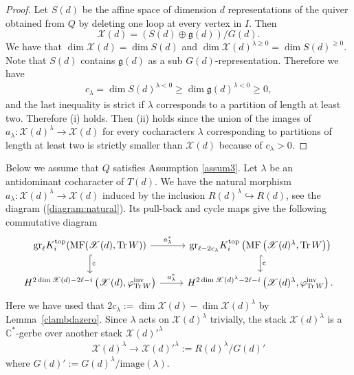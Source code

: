 \documentclass [11pt,oneside,a4paper,mathscr]{amsart}
\theoremstyle{definition}
\renewcommand{\geq}{\geqslant}
\newcommand{\X}{\mathscr{X}}
\newcommand{\Tr}{\mathop{\rm Tr}}
\begin{document}
\begin{proof}
    Let $S(d)$ be the affine space of dimension $d$ representations of 
the quiver obtained from $Q$ by deleting one loop at every vertex in $I$.
Then
\[\X(d)=\left(S(d)\oplus\mathfrak{g}(d)\right)/G(d).\] 
We have that 
$\dim \X(d)=\dim S(d)$ and $\dim \X(d)^{\lambda \geq 0}=\dim S(d)^{\geq 0}$. 
Note that $S(d)$ contains $\mathfrak{g}(d)$ as a 
sub $G(d)$-representation. 
Therefore we have 
\begin{align*}c_\lambda=\dim S(d)^{\lambda<0} \geq 
\dim \mathfrak{g}(d)^{\lambda<0}\geq 0,
\end{align*}
and 
the last inequality is strict if $\lambda$ corresponds
to a partition of length at least two. Therefore (i) 
holds. 
Then (ii) holds since the union of the images of
$a_{\lambda} \colon \X(d)^{\lambda} \to \X(d)$
for every cocharacters $\lambda$ corresponding to 
partitions of length at least two is strictly 
smaller than $\X(d)$ because of $c_{\lambda}>0$.  


\end{proof}


Below we assume that $Q$ satisfies Assumption \ref{assum3}.
Let $\lambda$ be an antidominant cocharacter of $T(d)$. 
We have the natural 
morphism $a_{\lambda} \colon \X(d)^{\lambda} \to \X(d)$ 
induced by the inclusion $R(d)^{\lambda} \hookrightarrow R(d)$, 
see the diagram (\ref{diagram:natural}). 
Its pull-back
and cycle maps give the following commutative 
diagram 
  \begin{equation}\label{comm:gra}
        \begin{tikzcd}
            \mathrm{gr}_\ell K^{\mathrm{top}}_i(\mathrm{MF}(\X(d), \Tr W)) \arrow[d, hook, "\mathrm{c}"]\arrow[r, "a^*_\lambda"]& 
            \mathrm{gr}_{\ell-2c_\lambda} K^{\mathrm{top}}_i\left(\mathrm{MF}\left(\X(d)^{\lambda}, \mathrm{Tr}\,W\right)\right)\arrow[d, hook, "\mathrm{c}"]\\
            H^{2\dim \X(d)-2\ell-i}\left(\X(d), \varphi_{\mathrm{Tr}\,W}^{\mathrm{inv}}\right)\arrow[r, "a^*_\lambda"]&  H^{2\dim \X(d)^{\lambda}-2\ell-i}\left(\X(d)^{\lambda}, \varphi_{\mathrm{Tr}\,W}^{\mathrm{inv}}\right). 
        \end{tikzcd}
    \end{equation} 
Here we have used that $2c_\lambda:=\dim \X(d)-\dim \X(d)^{\lambda}$ by Lemma~\ref{clambdazero}. 
Since $\lambda$ acts on $\X(d)^{\lambda}$ trivially, 
the stack $\X(d)^{\lambda}$ is a $\mathbb{C}^{\ast}$-gerbe 
over another stack $\X(d)'^\lambda$
\begin{align}\label{gerb:lambda}
    \X(d)^{\lambda} \to \X(d)'^\lambda:=R(d)^\lambda/G(d)'
\end{align}
where $G(d)':=G(d)^\lambda/\text{image}(\lambda)$. 
\end{document}
